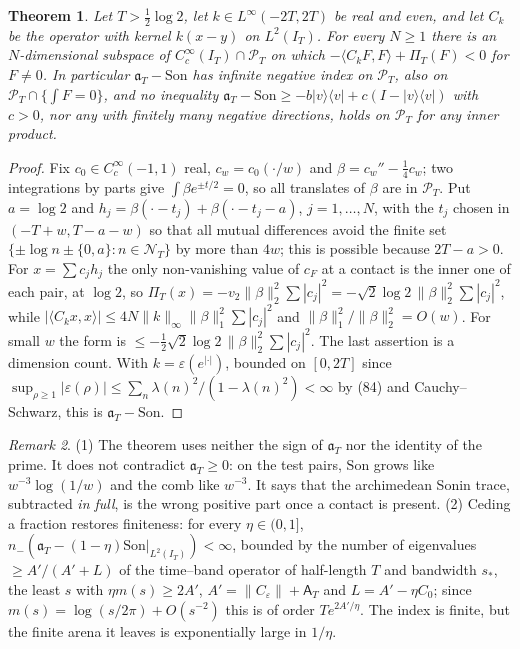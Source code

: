 \documentclass[11pt]{amsart}
\newtheorem{theorem}{Theorem}[section]
\theoremstyle{definition}
\theoremstyle{remark}
\newtheorem{remark}[theorem]{Remark}
\newcommand{\IT}{I_T}
\newcommand{\PT}{\mathcal P_T}
\newcommand{\cF}{c_F}
\newcommand{\NT}{\mathcal N_T}
\newcommand{\Aconst}{\mathsf A_T}
\newcommand{\PiT}{\Pi_T}
\newcommand{\Son}{\mathrm{Son}}
\begin{document}
\begin{theorem}\label{thm:nogo}
Let $T>\frac12\log2$, let $k\in L^\infty(-2T,2T)$ be real and even, and let $C_k$ be the operator with kernel
$k(x-y)$ on $L^2(\IT)$. For every $N\ge1$ there is an $N$-dimensional subspace of $C_c^\infty(\IT)\cap\PT$ on which
$-\langle C_kF,F\rangle+\PiT(F)<0$ for $F\neq0$. In particular $\mathfrak a_T-\Son$ has infinite negative index on
$\PT$, also on $\PT\cap\{\int F=0\}$, and no inequality
$\mathfrak a_T-\Son\ge-b|v\rangle\langle v|+c(I-|v\rangle\langle v|)$ with $c>0$, nor any with finitely many negative
directions, holds on $\PT$ for any inner product.
\end{theorem}
\begin{proof}
Fix $c_0\in C_c^\infty(-1,1)$ real, $c_w=c_0(\cdot/w)$ and $\beta=c_w''-\frac14c_w$; two integrations by parts give
$\int\beta e^{\pm t/2}=0$, so all translates of $\beta$ are in $\PT$. Put $a=\log2$ and
$h_j=\beta(\cdot-t_j)+\beta(\cdot-t_j-a)$, $j=1,\dots,N$, with the $t_j$ chosen in $(-T+w,T-a-w)$ so that all mutual
differences avoid the finite set $\{\pm\log n\pm\{0,a\}:n\in\NT\}$ by more than $4w$; this is possible because
$2T-a>0$. For $x=\sum c_jh_j$ the only non-vanishing value of $\cF$ at a contact is the inner one of each pair, at
$\log2$, so $\PiT(x)=-v_2\|\beta\|_2^2\sum|c_j|^2=-\sqrt2\log2\,\|\beta\|_2^2\sum|c_j|^2$, while
$|\langle C_kx,x\rangle|\le4N\|k\|_\infty\|\beta\|_1^2\sum|c_j|^2$ and $\|\beta\|_1^2/\|\beta\|_2^2=O(w)$. For small $w$
the form is $\le-\frac12\sqrt2\log2\,\|\beta\|_2^2\sum|c_j|^2$. The last assertion is a dimension count. With
$k=\varepsilon(e^{|\cdot|})$, bounded on $[0,2T]$ since $\sup_{\rho\ge1}|\varepsilon(\rho)|\le\sum_n\lambda(n)^2/(1-\lambda(n)^2)<\infty$ by (84) and Cauchy--Schwarz, this is $\mathfrak a_T-\Son$.
\end{proof}

\begin{remark}
(1) The theorem uses neither the sign of $\mathfrak a_T$ nor the identity of the prime. It does not contradict
$\mathfrak a_T\ge0$: on the test pairs, $\Son$ grows like $w^{-3}\log(1/w)$ and the comb like $w^{-3}$. It says that the
archimedean Sonin trace, subtracted \emph{in full}, is the wrong positive part once a contact is present. (2) Ceding a
fraction restores finiteness: for every $\eta\in(0,1]$, $n_-(\mathfrak a_T-(1-\eta)\Son|_{L^2(\IT)})<\infty$, bounded by the
number of eigenvalues $\ge A'/(A'+L)$ of the time--band operator of half-length $T$ and bandwidth $s_*$, the least $s$
with $\eta m(s)\ge2A'$, $A'=\|C_\varepsilon\|+\Aconst$ and $L=A'-\eta C_0$; since $m(s)=\log(s/2\pi)+O(s^{-2})$ this is of order
$Te^{2A'/\eta}$. The index is finite, but the finite arena it leaves is exponentially large in $1/\eta$.
\end{remark}
\end{document}
